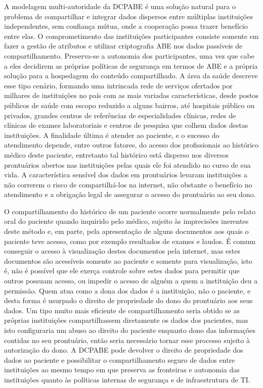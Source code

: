 \documentclass[a4paper,11pt]{article}
\begin{document}
A modelagem multi-autoridade da DCPABE é uma solução natural para o problema de compartilhar e integrar dados dispersos entre múltiplas instituições independentes, sem confiança mútua, onde a cooperação possa trazer benefício entre elas.
O comprometimento das instituições participantes consiste somente em fazer a gestão de atributos e utilizar criptografia ABE nos dados passíveis de compartilhamento.
Preserva-se a autonomia dos participantes, uma vez que cabe a eles decidirem as próprias políticas de segurança em termos de ABE e a própria solução para a hospedagem do conteúdo compartilhado. %
A área da saúde descreve esse tipo cenário, formando uma intrincada rede de serviços ofertados por milhares de instituições no país com as mais variadas características, desde postos públicos de saúde com escopo reduzido a alguns bairros, até hospitais público ou privados, grandes centros de referências de especialidades clínicas, redes de clínicas de exames laboratoriais e centros de pesquisa que colhem dados destas instituições.
A finalidade última é atender ao paciente, e o sucesso do atendimento depende, entre outros fatores, do acesso dos profissionais ao histórico médico deste paciente, entretanto tal histórico está disperso nos diversos prontuários abertos nas instituições pelas quais ele foi atendido no curso de sua vida.
A característica sensível dos dados em prontuários levaram instituições a não correrem o risco de compartilhá-los na internet, não obstante o benefício no atendimento e a obrigação legal de assegurar o acesso do prontuário ao seu dono.

O compartilhamento do histórico de um paciente ocorre normalmente pelo relato oral do paciente quando inquirido pelo médico, sujeito às imprecisões inerentes deste método e, em parte, pela apresentação de alguns documentos aos quais o paciente teve acesso, como por exemplo resultados de exames e laudos.
É comum conseguir o acesso à visualização destes documentos pela internet, mas estes documentos são acessíveis somente ao paciente e somente para visualização, isto é, não é possível que ele exerça controle sobre estes dados para permitir que outros possuam acesso, ou impedir o acesso de alguém a quem a instituição deu a permissão.
Quem atua como a dona dos dados é a instituição, não o paciente, e desta forma é usurpado o direito de propriedade do dono do prontuário aos seus dados.
Um tipo muito mais eficiente de compartilhamento seria obtido se as próprias instituições compartilhassem diretamente os dados dos pacientes, mas isto configuraria um abuso ao direito do paciente enquanto dono das informações contidas no seu prontuário, então seria necessário tornar esse processo sujeito à autorização do dono.
A DCPABE pode devolver o direito de propriedade dos dados ao paciente e possibilitar o compartilhamento seguro de dados entre instituições ao mesmo tempo em que preserva as fronteiras e autonomia das instituições quanto às políticas internas de segurança e de infraestrutura de TI.
\end{document}
